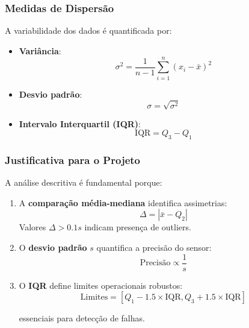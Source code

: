 \documentclass[12pt, a4paper]{article}
\begin{document}
\subsubsection{Medidas de Dispersão}
A variabilidade dos dados é quantificada por:

\begin{itemize}
    \item \textbf{Variância}:
        \begin{equation}
            {\sigma}^2 = \frac{1}{n-1}\sum_{i=1}^n (x_i - \bar{x})^2
        \end{equation}

    \item \textbf{Desvio padrão}:
        \begin{equation}
            {\sigma} = \sqrt{{\sigma}^2}
        \end{equation}

    \item \textbf{Intervalo Interquartil (IQR)}:
        \begin{equation}
            \text{IQR} = Q_3 - Q_1
        \end{equation}
\end{itemize}

\subsubsection{Justificativa para o Projeto}
A análise descritiva é fundamental porque:

\begin{enumerate}
    \item A \textbf{comparação média-mediana} identifica assimetrias:
        \begin{equation}
            \Delta = |\bar{x} - Q_2|
        \end{equation}
        Valores $\Delta > 0.1s$ indicam presença de outliers.

    \item O \textbf{desvio padrão} $s$ quantifica a precisão do sensor:
        \begin{equation}
            \text{Precisão} \propto \frac{1}{s}
        \end{equation}

    \item O \textbf{IQR} define limites operacionais robustos:
        \begin{equation}
            \text{Limites} = \left[ Q_1 - 1.5 \times \text{IQR}, Q_3 + 1.5 \times \text{IQR} \right]
        \end{equation}

        essenciais para detecção de falhas.
\end{enumerate}
\end{document}

